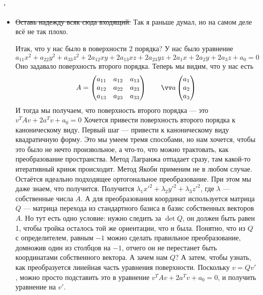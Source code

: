\documentclass{article}
\let\vec\vv
\begin{document}
    \paragraph{.}
    \begin{itemize}
        \item[]
        \begin{Comment}
            \sout{Оставь надежду всяк сюда входящий.} Так я раньше думал, но на самом деле всё не так плохо.
        \end{Comment}
        \begin{Comment}
            Итак, что у нас было в поверхности 2 порядка? У нас было уравнение
            $$
            a_{11}x^2+a_{22}y^2+a_{33}z^2+2a_{12}xy+2a_{13}xz+2a_{23}yz+2a_1x+2a_2y+2a_3z+a_0=0
            $$
            Оно задавало поверхность второго порядка. Теперь мы видим, что у нас есть
            $$
            A=\matr{
                a_{11} & a_{12} & a_{13}\\
                a_{12} & a_{22} & a_{23}\\
                a_{13} & a_{23} & a_{33}
            }\qquad\vec a\matr{a_1\\a_2\\a_3}
            $$
            И тогда мы получаем, что поверхность второго порядка --- это
            $v^TAv+2a^Tv+a_0=0$
            Хочется привести поверхность второго порядка к каноническому виду. Первый шаг --- привести к каноническому виду квадратичную форму. Это мы умеем тремя способами, но нам хочется, чтобы это было не нечто произвольное, а что-то, что можно трактовать, как преобразование пространства. Метод Лагранжа отпадает сразу, там какой-то итеративный кринж происходит. Метод Якоби применим не в любом случае. Остаётся идеально подходящее ортогональное преобразование. При этом мы даже знаем, что получится. Получится $\lambda_1{x'}^2+\lambda_2{y'}^2+\lambda_3{z'}^2$, где $\lambda$ --- собственные числа $A$. А для преобразования координат используется матрица $Q$ --- матрица перехода из стандартного базиса в базис собственных векторов $A$. Но тут есть одно условие: нужно следить за $\det Q$, он должен быть равен 1, чтобы тройка осталось той же ориентации, что и была. Понятно, что из $Q$ с определителем, равным $-1$ можно сделать правильное преобразование, домножив один из столбцов на $-1$, отчего он не перестанет быть координатами собственного вектора. А зачем нам $Q$? А затем, чтобы узнать, как преобразуется линейная часть уравнения поверхности. Поскольку $v=Qv'$, можно просто подставить это в уравнение $v^TAv+2a^Tv+a_0=0$, и получить уравнение на $v'$.\\

\end{Comment}
\end{itemize}
\end{document}
